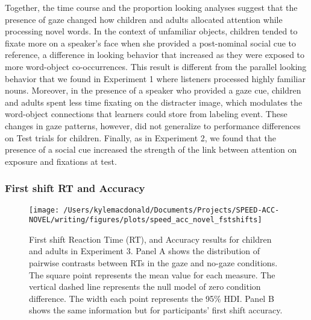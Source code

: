 \documentclass[man,floatsintext]{apa6}
\begin{document}
Together, the time course and the proportion looking analyses suggest
that the presence of gaze changed how children and adults allocated
attention while processing novel words. In the context of unfamiliar
objects, children tended to fixate more on a speaker's face when she
provided a post-nominal social cue to reference, a difference in looking
behavior that increased as they were exposed to more word-object
co-occurrences. This result is different from the parallel looking
behavior that we found in Experiment 1 where listeners processed highly
familiar nouns. Moreover, in the presence of a speaker who provided a
gaze cue, children and adults spent less time fixating on the distracter
image, which modulates the word-object connections that learners could
store from labeling event. These changes in gaze patterns, however, did
not generalize to performance differences on Test trials for children.
Finally, as in Experiment 2, we found that the presence of a social cue
increased the strength of the link between attention on exposure and
fixations at test.

\subsubsection{First shift RT and
Accuracy}\label{first-shift-rt-and-accuracy}

\begin{figure}[!t]

{\centering \texttt{[image: /Users/kylemacdonald/Documents/Projects/SPEED-ACC-NOVEL/writing/figures/plots/speed\_acc\_novel\_fstshifts]} 

}

\caption{First shift Reaction Time (RT), and Accuracy results for children and adults in Experiment 3. Panel A shows the distribution of pairwise contrasts between RTs in the gaze and no-gaze conditions. The square point represents the mean value for each measure. The vertical dashed line represents the null model of zero condition difference. The width each point represents the 95\% HDI. Panel B shows the same information but for participants' first shift accuracy.}\label{fig:speed-acc-novel-shifts}
\end{figure}
\end{document}
